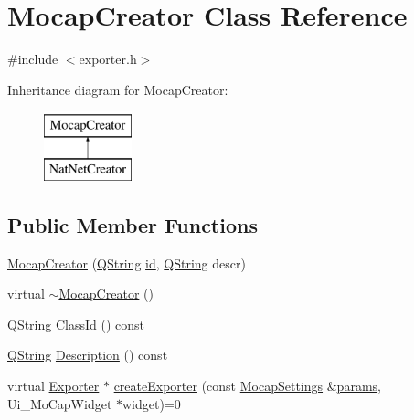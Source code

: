 \hypertarget{class_mocap_creator}{\section{Mocap\-Creator Class Reference}
\label{class_mocap_creator}
}


{\ttfamily \#include $<$exporter.\-h$>$}

Inheritance diagram for Mocap\-Creator\-:\begin{figure}[H]
\begin{center}
\leavevmode
\includegraphics[height=2.000000cm]{class_mocap_creator}
\end{center}
\end{figure}
\subsection*{Public Member Functions}
\begin{DoxyCompactItemize}
\item 
\hyperlink{group___mo_cap_plugin_ga90d59062e3d2c753e512451b60a977e8}{Mocap\-Creator} (\hyperlink{group___u_a_v_objects_plugin_gab9d252f49c333c94a72f97ce3105a32d}{Q\-String} \hyperlink{glext_8h_a58c2a664503e14ffb8f21012aabff3e9}{id}, \hyperlink{group___u_a_v_objects_plugin_gab9d252f49c333c94a72f97ce3105a32d}{Q\-String} descr)
\item 
virtual \hyperlink{group___mo_cap_plugin_ga934741ed7c6804f46b162987c2b9b5c8}{$\sim$\-Mocap\-Creator} ()
\item 
\hyperlink{group___u_a_v_objects_plugin_gab9d252f49c333c94a72f97ce3105a32d}{Q\-String} \hyperlink{group___mo_cap_plugin_ga775e3a65e804fbbeba1680da9b949286}{Class\-Id} () const 
\item 
\hyperlink{group___u_a_v_objects_plugin_gab9d252f49c333c94a72f97ce3105a32d}{Q\-String} \hyperlink{group___mo_cap_plugin_ga0eb79ab6540fef8926129b47aef0a2a8}{Description} () const 
\item 
virtual \hyperlink{class_exporter}{Exporter} $\ast$ \hyperlink{group___mo_cap_plugin_gaa300503bdf633291aeab43797cc61939}{create\-Exporter} (const \hyperlink{group___mo_cap_plugin_ga6083347a5b3eb70e360f599354dc0f0b}{Mocap\-Settings} \&\hyperlink{glext_8h_afeb6390ab3bc8a0e96a88aff34d52288}{params}, Ui\-\_\-\-Mo\-Cap\-Widget $\ast$widget)=0
\end{DoxyCompactItemize}



